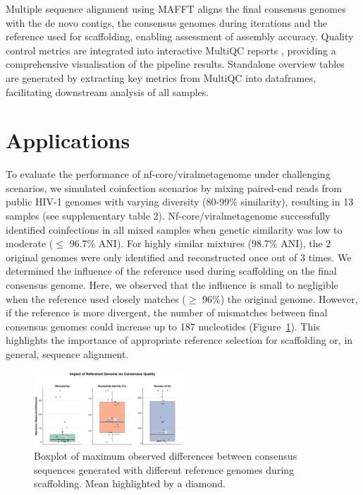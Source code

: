 Multiple sequence alignment using MAFFT \cite{Katoh2002-ox} aligns the final consensus genomes with the de novo contigs, the consensus genomes during iterations and the reference used for scaffolding, enabling assessment of assembly accuracy. Quality control metrics are integrated into interactive MultiQC reports \cite{Ewels2016-hs}, providing a comprehensive visualisation of the pipeline results. Standalone overview tables are generated by extracting key metrics from MultiQC into dataframes, facilitating downstream analysis of all samples.

\section{Applications}


To evaluate the performance of nf-core/viralmetagenome under challenging scenarios, we simulated coinfection scenarios by mixing paired-end reads from public HIV-1 genomes with varying diversity (80-99\% similarity), resulting in 13 samples (see supplementary table 2). Nf-core/viralmetagenome successfully identified coinfections in all mixed samples when genetic similarity was low to moderate ($\leq$ 96.7\% ANI). For highly similar mixtures (98.7\% ANI), the 2 original genomes were only identified and reconstructed once out of 3 times.
We determined the influence of the reference used during scaffolding on the final consensus genome. Here, we observed that the influence is small to negligible when the reference used closely matches ($\geq$ 96\%) the original genome. However, if the reference is more divergent, the number of mismatches between final consensus genomes could increase up to 187 nucleotides (Figure~\ref{fig:reference-influence}). This highlights the importance of appropriate reference selection for scaffolding or, in general, sequence alignment.

\begin{figure}[htbp]
    \centering
    \includegraphics[width=0.5\textwidth]{Fig/fig2.png}
    \caption{Boxplot of maximum observed differences between consensus sequences generated with different reference genomes during scaffolding. Mean highlighted by a diamond.}
    \label{fig:reference-influence}
\end{figure}


